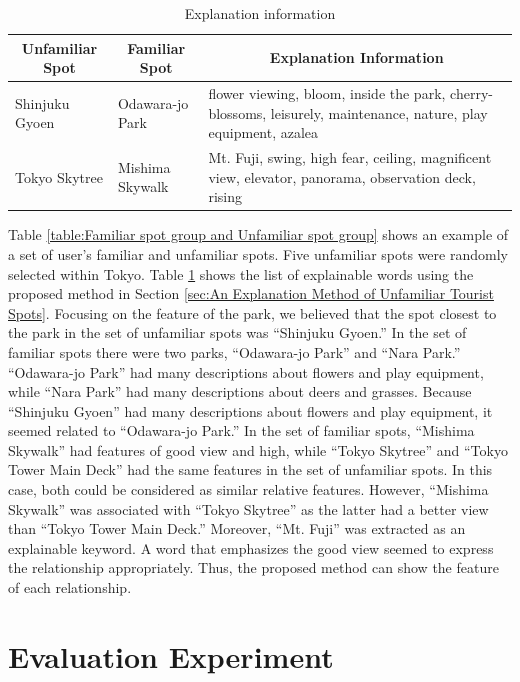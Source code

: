 \documentclass[journal]{IAENGtran}
\begin{document}
\begin{table}[t]
  \caption{Explanation information}
  \label{table:Explanation information}
  \centering
  \begin{tabular}{l|l|l}
  \hline
  \multicolumn{1}{c|}{Unfamiliar Spot} & \multicolumn{1}{c|}{Familiar Spot} & \multicolumn{1}{c}{Explanation Information}                     \\ \hline
  Shinjuku Gyoen                      & Odawara-jo Park                         & flower viewing, bloom, inside the park, cherry-blossoms, leisurely, maintenance, nature, play equipment, azalea          \\
  Tokyo Skytree                     & Mishima Skywalk                    & Mt. Fuji, swing, high fear, ceiling, magnificent view, elevator, panorama, observation deck, rising
 \\ \hline
  \end{tabular}
\end{table}

Table \ref{table:Familiar spot group and Unfamiliar spot group} shows an example of a set of user's familiar and unfamiliar spots. Five unfamiliar spots were randomly selected within Tokyo. Table \ref{table:Explanation information} shows the list of explainable words using the proposed method in Section \ref{sec:An Explanation Method of Unfamiliar Tourist Spots}.
   Focusing on the feature of the park, we believed that the spot closest to the park in the set of unfamiliar spots was ``Shinjuku Gyoen.'' In the set of familiar spots there were two parks, ``Odawara-jo Park'' and ``Nara Park.''
``Odawara-jo Park'' had many descriptions about flowers and play equipment, while ``Nara Park'' had many descriptions about deers and grasses. Because ``Shinjuku Gyoen'' had many descriptions about flowers and play equipment, it seemed related to ``Odawara-jo Park.''
   In the set of familiar spots, ``Mishima Skywalk'' had features of good view and high, while ``Tokyo Skytree'' and ``Tokyo Tower Main Deck'' had the same features in the set of unfamiliar spots. In this case, both could be considered as similar relative features. However, ``Mishima Skywalk'' was associated with ``Tokyo Skytree'' as the latter had a better view than ``Tokyo Tower Main Deck.'' Moreover, ``Mt. Fuji'' was extracted as an explainable keyword. A word that emphasizes the good view seemed to express the relationship appropriately. Thus, the proposed method can show the feature of each relationship.

\section{Evaluation Experiment}
\label{sec:Evaluation Experiment}
\end{document}
